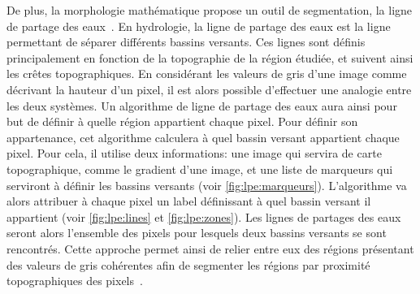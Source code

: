 \documentclass[\main/main.tex]{subfiles}
\begin{document}
%
De plus, la morphologie mathématique propose un outil de segmentation, la ligne de partage des eaux~\cite{meyer_1994}.
%
En hydrologie, la ligne de partage des eaux est la ligne permettant de séparer différents bassins versants.
%
Ces lignes sont définis principalement en fonction de la topographie de la région étudiée, et suivent ainsi les crêtes topographiques.
%
En considérant les valeurs de gris d'une image comme décrivant la hauteur d'un pixel,
il est alors possible d'effectuer une analogie entre les deux systèmes.
%
Un algorithme de ligne de partage des eaux aura ainsi pour but de définir à quelle région appartient chaque pixel.
%
Pour définir son appartenance,
cet algorithme calculera à quel bassin versant appartient chaque pixel.
%
Pour cela, il utilise deux informations: une image qui servira de carte topographique, comme le gradient d'une image, et une liste de marqueurs qui serviront à définir les bassins versants (voir \autoref{fig:lpe:marqueurs}).
%
L'algorithme va alors attribuer à chaque pixel un label définissant à quel bassin versant il appartient (voir \autoref{fig:lpe:lines} et \autoref{fig:lpe:zones}).
%
Les lignes de partages des eaux seront alors l'ensemble des pixels pour lesquels deux bassins versants se sont rencontrés.
%
Cette approche permet ainsi de relier entre eux des régions présentant des valeurs de gris cohérentes afin de segmenter les régions par proximité topographiques des pixels~\cite{liang_2019,eschweiler_2019}.
%
\end{document}
